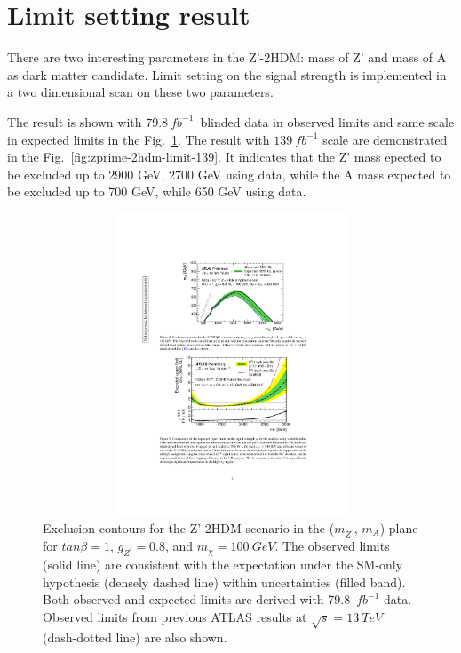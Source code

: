 \section{Limit setting result}
\label{sec:limitres}

\par There are two interesting parameters in the Z'-2HDM: mass of Z' and mass of A as dark matter candidate. 
Limit setting on the signal strength is implemented in a two dimensional scan on these two parameters.

\par The result is shown with $79.8~fb^{-1}$~blinded data in observed limits and same scale in expected limits in the Fig.~\ref{fig:zprime-2hdm-limit-80}. 
The result with $139~fb^{-1}$ scale are demonstrated in the Fig.~\ref{fig:zprime-2hdm-limit-139}. 
It indicates that the Z' mass epected to be excluded up to 2900 GeV, 2700 GeV using data, while the A mass expected to be excluded up to 700 GeV, while 650 GeV using data.

\begin{figure}[!htb]
    \centering
    \includegraphics[width=12cm, height=9cm, trim={6cm 17cm 5.8cm 4.5cm}, clip]{chapters/c9/figures/ZPrime2HDMLimit-80Exp.pdf}
    \caption{Exclusion contours for the Z'-2HDM scenario in the ($m_{Z^{\prime}}$, $m_{A}$) plane for $tan\beta= 1$, $g_{Z^{\prime}}=0.8$, and $m_{\chi}=100~GeV$. 
    The observed limits (solid line) are consistent with the expectation under the SM-only hypothesis (densely dashed line) within uncertainties (filled band). 
    Both observed and expected limits are derived with 79.8~$fb^{-1}$ data. 
    Observed limits from previous ATLAS results at $\sqrt{s}=13~TeV$ (dash-dotted line) are also shown.}
    \label{fig:zprime-2hdm-limit-80}
\end{figure}

